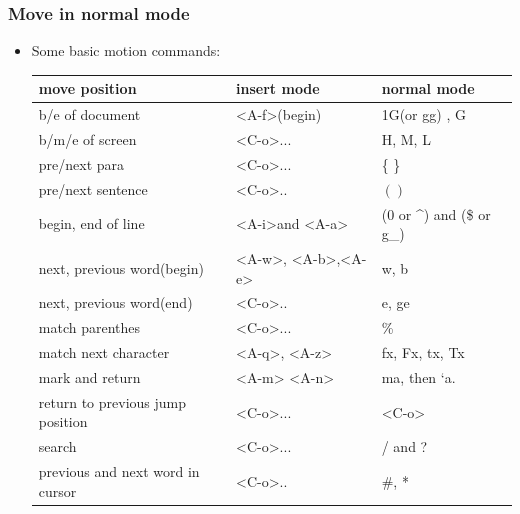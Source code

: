\documentclass[a4paper,12pt,twoside]{book}
\begin{document}
\subsubsection{Move in normal mode}
	\begin{itemize}

	\item Some basic motion commands: 
	\begin{center}
		\begin{tabular}{p{}|p{}|p{}}
		\hline 
        move position & insert mode & normal mode \\

		\hline
		b/e of document &  <A-f>(begin)  & 1G(or gg) , G  \\

	    \hline 
		b/m/e of screen & <C-o>... & H, M, L \\

		\hline 
		pre/next para & <C-o>... &\{ \} \\

		\hline 
		pre/next sentence & <C-o>.. & $( )$ \\
		
		\hline 
		begin, end of line &<A-i>and <A-a> & (0 or \^{}) and (\$ or g\_)  \\
		
	   	\hline 		
		next, previous word(begin) &<A-w>, <A-b>,<A-e>  & w, b\\   

	    \hline
	    next, previous word(end) & <C-o>.. & e, ge \\
 	
         \hline 		
         match parenthes & <C-o>... & \%   \\
         
         \hline 
		 match next character &<A-q>, <A-z>& fx, Fx, tx, Tx \\
         
        \hline  
		mark and return & <A-m> <A-n> & ma, then `a. \\
        
        \hline 
		return to previous jump position & <C-o>... & <C-o> \\    
      				
		\hline
        search &<C-o>...  & / and ? \\

       \hline       
		previous and next word in cursor & <C-o>.. & \#, * \\


\end{tabular}
\end{center}
\end{itemize}
\end{document}
